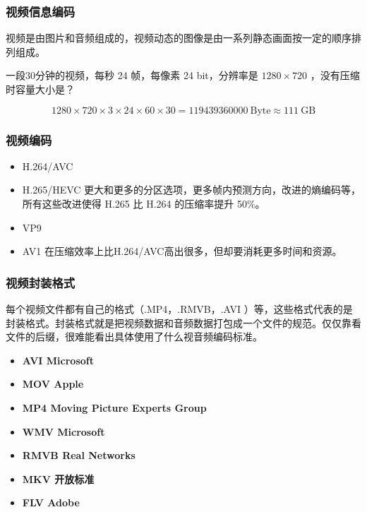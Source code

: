 \begin{frame}[t]
    \frametitle{视频信息编码}
    视频是由图片和音频组成的，视频动态的图像是由一系列静态画面按一定的顺序排列组成。
    \begin{question}
        一段30分钟的视频，每秒 24 帧，每像素 24 bit，分辨率是 $1280\times 720$ ，没有压缩时容量大小是？
    \end{question}
    \pause
    \[
        1280\times 720\times 3\times 24\times 60\times 30 = 119439360000 \mathrm{\ Byte} \approx 111 \mathrm{\ GB}
    \]
\end{frame}

\begin{frame}
    \frametitle{视频编码}
    \begin{itemize}
      \item H.264/AVC
      \item H.265/HEVC 更大和更多的分区选项，更多帧内预测方向，改进的熵编码等，所有这些改进使得 H.265 比 H.264 的压缩率提升 50\%。
      \item VP9
      \item AV1 在压缩效率上比H.264/AVC高出很多，但却要消耗更多时间和资源。
    \end{itemize}
\end{frame}

\begin{frame}
    \frametitle{视频封装格式}
    每个视频文件都有自己的格式（.MP4，.RMVB，.AVI ）等，这些格式代表的是封装格式。封装格式就是把视频数据和音频数据打包成一个文件的规范。仅仅靠看文件的后缀，很难能看出具体使用了什么视音频编码标准。
    \begin{itemize}
      \item \bf{AVI} \quad Microsoft
      \item \bf{MOV} \quad Apple
      \item \bf{MP4} \quad Moving Picture Experts Group
      \item \bf{WMV} \quad Microsoft
      \item \bf{RMVB} \quad Real Networks
      \item \bf{MKV} \quad 开放标准
      \item \bf{FLV} \quad Adobe
    \end{itemize}
\end{frame}